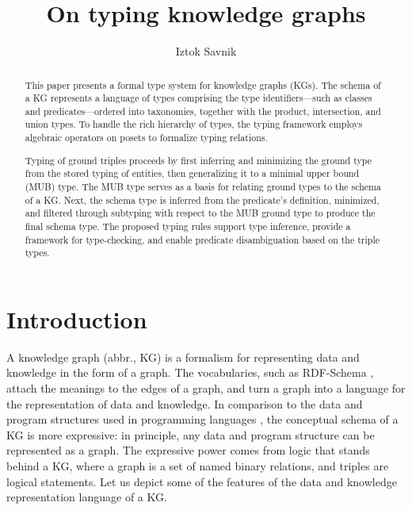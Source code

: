 \documentclass[runningheads]{llncs}
\begin{document}
\title{On typing knowledge graphs}

\author{Iztok Savnik} 



\maketitle

\begin{abstract}
  This paper presents a formal type system for knowledge graphs (KGs).
  The schema of a KG represents a language of types comprising the
  type identifiers---such as classes and predicates---ordered into
  taxonomies, together with the product, intersection, and union
  types. To handle the rich hierarchy of types, the typing framework
  employs algebraic operators on posets to formalize typing relations.

  Typing of ground triples proceeds by first inferring and minimizing
  the ground type from the stored typing of entities, then
  generalizing it to a minimal upper bound (MUB) type. The MUB type
  serves as a basis for relating ground types to the schema of a
  KG. Next, the schema type is inferred from the predicate’s
  definition, minimized, and filtered through subtyping with respect
  to the MUB ground type to produce the final schema type. The
  proposed typing rules support type inference, provide a framework
  for type-checking, and enable predicate disambiguation based on the
  triple types.

\end{abstract}


\thispagestyle{headings}





\section{Introduction}

A knowledge graph (abbr., KG) is a formalism for representing data and
knowledge in the form of a graph. The vocabularies, such as RDF-Schema
\cite{rdfschema}, attach the meanings to the edges of a graph, and
turn a graph into a language for the representation of data and
knowledge. In comparison to the data and program structures used in
programming languages \cite{Pierce2002,Hindley1997}, the conceptual
schema of a KG is more expressive: in principle, any data and program
structure can be represented as a graph. The expressive power comes
from logic that stands behind a KG, where a graph is a set of named
binary relations, and triples are logical statements. Let us depict
some of the features of the data and knowledge representation language
of a KG.
\end{document}
